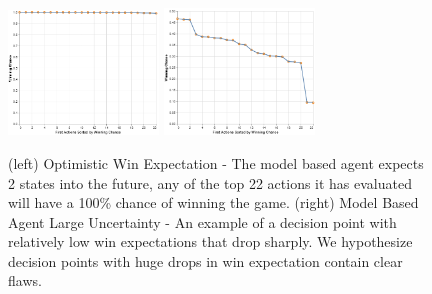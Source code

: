 \documentclass{article}
\begin{document}
\begin{figure}[tp]
    \centering
    \includegraphics[width=4cm]{img/bugs/chart/noDrop.PNG}
    \includegraphics[width=4cm]{img/bugs/chart/bigDrop.PNG}
    \caption{(left) Optimistic Win Expectation - The model based agent expects 2 states into the future, any of the top 22 actions it has evaluated will have a 100\% chance of winning the game. (right) Model Based Agent Large Uncertainty - An example of a decision point with relatively low win expectations that drop sharply. We hypothesize decision points with huge drops in win expectation contain clear flaws.  }
    \label{fig:ToW-q-Chart}
\end{figure}




\end{document}
